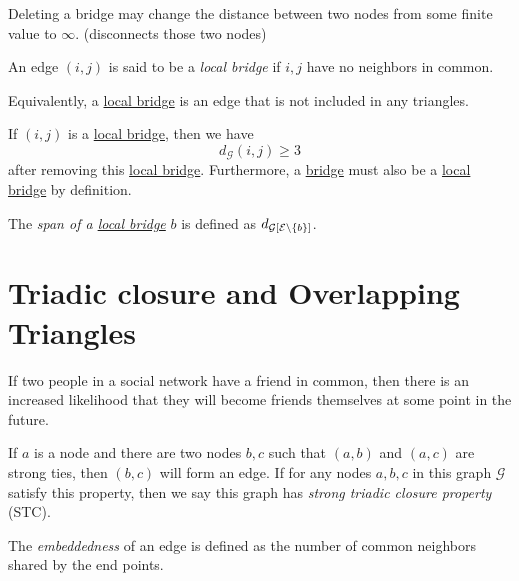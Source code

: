 \begin{remark}
	Deleting a bridge may change the distance between two nodes from some finite value to \(\infty\). (disconnects those two nodes)
\end{remark}

\begin{definition}\label{def:local-bridge}
	An edge \((i, j)\) is said to be a \emph{local bridge} if \(i, j\) have no neighbors in common.
\end{definition}

\begin{note}
	Equivalently, a \hyperref[def:local-bridge]{local bridge} is an edge that is not included in any triangles.
\end{note}

\begin{remark}
	If \((i, j)\) is a \hyperref[def:local-bridge]{local bridge}, then we have
	\[
		d_{\mathcal{G}}(i, j) \geq  3
	\]
	after removing this \hyperref[def:local-bridge]{local bridge}. Furthermore, a \hyperref[def:bridge]{bridge} must also be a
	\hyperref[def:local-bridge]{local bridge} by definition.
\end{remark}

\begin{definition}
	The \emph{span of a \hyperref[def:local-bridge]{local bridge}} \(b\) is defined as \(d_{\mathcal{G}[\mathcal{\MakeUppercase{e}} \setminus \{b\}]}\).
\end{definition}

\section{Triadic closure and Overlapping Triangles}
\begin{intuition}
	If two people in a social network have a friend in common, then there is an increased likelihood that they will become friends themselves at some point in the future.
\end{intuition}

\begin{definition}\label{def:strong-triadic-closure}
	If \(a\) is a node and there are two nodes \(b, c\) such that \((a, b)\) and \((a, c)\) are strong ties, then \((b, c)\) will form an edge.
	If for any nodes \(a, b, c\) in this graph \(\mathcal{G}\) satisfy this property, then we say this graph has \emph{strong triadic closure property} (STC).
\end{definition}

\begin{definition}[Embeddedness]\label{def:embeddedness}
	The \emph{embeddedness} of an edge is defined as the number of common neighbors shared by the end points.
\end{definition}